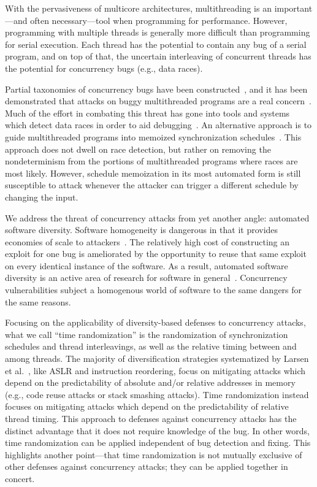 With the pervasiveness of multicore architectures, multithreading is an
important---and often necessary---tool when programming for performance.
However, programming with multiple threads is generally more difficult than programming for serial execution.
Each thread has the potential to contain any bug of a serial program, and on
top of that, the uncertain interleaving of concurrent threads has the
potential for concurrency bugs (e.g., data races).

Partial taxonomies of concurrency bugs have been constructed~\cite{Farchi2003, Lu2008}, and it has been demonstrated that attacks on buggy multithreaded programs are a real concern~\cite{Yang2012}.
Much of the effort in combating this threat has gone into tools and systems which detect data races in order to aid debugging~\cite{Savage1997, Flanagan2004, Laadan2011, Pratikakis2011, Kasikci2013}.
An alternative approach is to guide multithreaded programs into memoized synchronization schedules~\cite{Cui2010}.
This approach does not dwell on race detection, but rather on removing the nondeterminism from the portions of multithreaded programs where races are most likely.
However, schedule memoization in its most automated form is still susceptible to attack whenever the attacker can trigger a different schedule by changing the input.

We address the threat of concurrency attacks from yet another angle: automated software diversity.
Software homogeneity is dangerous in that it provides economies of scale to attackers~\cite{Geer2003b}.
The relatively high cost of constructing an exploit for one bug is ameliorated by the opportunity to reuse that same exploit on every identical instance of the software.
As a result, automated software diversity is an active area of research for software in general~\cite{Larsen2014}.
Concurrency vulnerabilities subject a homogenous world of software to the same dangers for the same reasons.

Focusing on the applicability of diversity-based defenses to concurrency attacks, what we call ``time randomization'' is the randomization of synchronization schedules and thread interleavings, as well as the relative timing between and among threads.
The majority of diversification strategies systematized by Larsen et al.~\cite{Larsen2014}, like ASLR and instruction reordering, focus on mitigating attacks which depend on the predictability of absolute and/or relative addresses in memory (e.g., code reuse attacks or stack smashing attacks).
Time randomization instead focuses on mitigating attacks which depend on the predictability of relative thread timing.
This approach to defenses against concurrency attacks has the distinct advantage that it does not require knowledge of the bug.
In other words, time randomization can be applied independent of bug detection and fixing.
This highlights another point---that time randomization is not mutually exclusive of other defenses against concurrency attacks; they can be applied together in concert.

